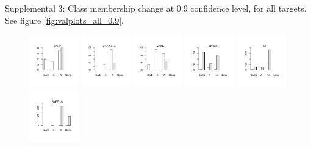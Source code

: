 \documentclass[utf8]{frontiersSCNS} %
\begin{document}
Supplemental 3: Class membership change at 0.9 confidence level, for all
targets. See figure \ref{fig:valplots_all_0.9}.

\begin{figure}[h!]

\vspace*{-15pt} %
\includegraphics[width=0.19\textwidth]{figures/validation_plots/ache_0p9_valplot.pdf}
\includegraphics[width=0.19\textwidth]{figures/validation_plots/adora2a_0p9_valplot.pdf}
\includegraphics[width=0.19\textwidth]{figures/validation_plots/adrb1_0p9_valplot.pdf}
\includegraphics[width=0.19\textwidth]{figures/validation_plots/adrb2_0p9_valplot.pdf}
\includegraphics[width=0.19\textwidth]{figures/validation_plots/ar_0p9_valplot.pdf}
\vspace*{-15pt} %
\includegraphics[width=0.19\textwidth]{figures/validation_plots/avpr1a_0p9_valplot.pdf}

\end{figure}
\end{document}
